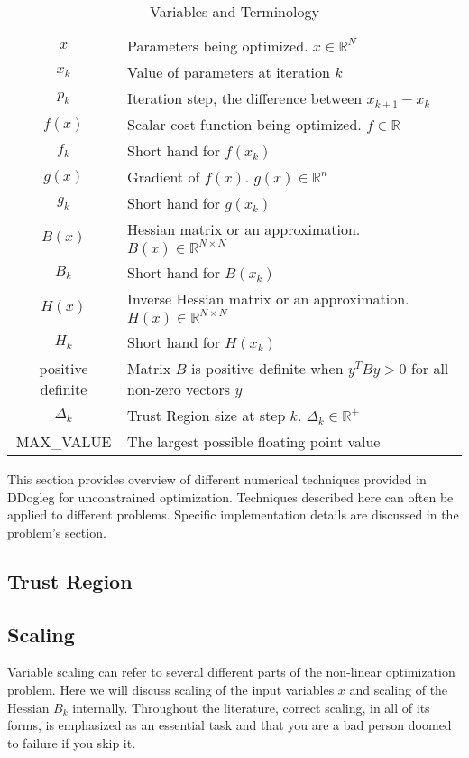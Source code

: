 \documentclass[peerreview,compsoc,onecolumn]{IEEEtran}
\newcommand{\R}{\mathbb{R}}
\begin{document}
\begin{table}[h]
\centering
\caption{Variables and Terminology}
\begin{tabular}{cl}
$x$ & Parameters being optimized. $x \in \R^N$ \\
$x_k$ & Value of parameters at iteration $k$ \\
$p_k$ & Iteration step, the difference between $x_{k+1}-x_k$ \\
$f(x)$ & Scalar cost function being optimized. $f \in \R$ \\
$f_k$ & Short hand for $f(x_k)$ \\
$g(x)$ & Gradient of $f(x)$. $g(x) \in \R^n$ \\
$g_k$ & Short hand for $g(x_k)$ \\
$B(x)$ & Hessian matrix or an approximation. $B(x) \in \R^{N \times N}$ \\ 
$B_k$ & Short hand for $B(x_k)$ \\
$H(x)$ & Inverse Hessian matrix or an approximation. $H(x) \in \R^{N \times N}$  \\ 
$H_k$ & Short hand for $H(x_k)$ \\
positive definite & Matrix $B$ is positive definite when $y^T B y > 0$ for all non-zero vectors $y$  \\
$\Delta_k$ & Trust Region size at step $k$. $\Delta_k \in \R^{+}$\\
MAX\_VALUE & The largest possible floating point value
\end{tabular}
\end{table}

This section provides overview of different numerical techniques provided in DDogleg for unconstrained optimization. Techniques described here can often be applied to different problems. Specific implementation details are discussed in the problem's section.

\subsection{Trust Region}



\subsection{Scaling}
\label{section:scaling}

Variable scaling can refer to several different parts of the non-linear optimization problem. Here we will discuss scaling of the input variables $x$ and scaling of the Hessian $B_k$ internally. Throughout the literature, correct scaling, in all of its forms, is emphasized as an essential task and that you are a bad person doomed to failure if you skip it. 
\end{document}
